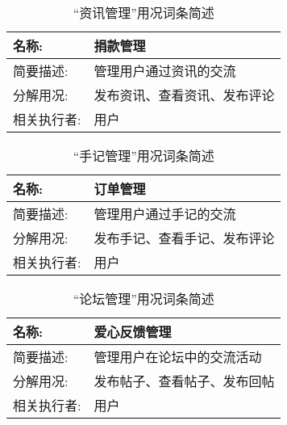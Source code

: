 \begin{table}[H]  
\caption{“资讯管理”用况词条简述}  
\begin{center}  
    \begin{tabular}{l p{11cm}} 
        \hline
        \quad 名称:  & 捐款管理 \\
        \hline
        \quad 简要描述:  & 管理用户通过资讯的交流 \\
        \hline
        \quad 分解用况:  & 发布资讯、查看资讯、发布评论 \\
        \hline
        \quad 相关执行者:  & 用户 \\
        \hline
    \end{tabular}
    \label{tab1}
\end{center}
\end{table}

\begin{table}[H]  
\caption{“手记管理”用况词条简述}  
\begin{center}  
    \begin{tabular}{l p{11cm}} 
        \hline
        \quad 名称:  & 订单管理 \\
        \hline
        \quad 简要描述:  & 管理用户通过手记的交流 \\
        \hline
        \quad 分解用况:  & 发布手记、查看手记、发布评论 \\
        \hline
        \quad 相关执行者:  &用户 \\
        \hline
    \end{tabular}
    \label{tab1}
\end{center}
\end{table}

\begin{table}[H]  
\caption{“论坛管理”用况词条简述}  
\begin{center}  
    \begin{tabular}{l p{11cm}} 
        \hline
        \quad 名称:  & 爱心反馈管理 \\
        \hline
        \quad 简要描述:  & 管理用户在论坛中的交流活动 \\
        \hline
        \quad 分解用况:  & 发布帖子、查看帖子、发布回帖 \\
        \hline
        \quad 相关执行者:  & 用户 \\
        \hline
    \end{tabular}
    \label{tab1}
\end{center}
\end{table}

